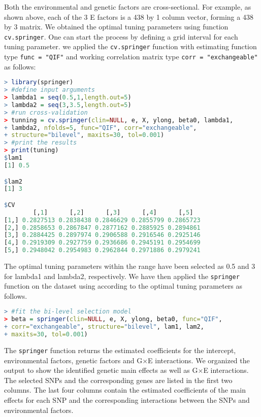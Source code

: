 \documentclass[12pt]{article}
\begin{document}
Both the environmental and genetic factors are cross-sectional. For example, as shown above, each of the 3 E factors is a 438 by 1 column vector, forming a 438 by 3 matrix. We obtained the optimal tuning parameters using function \texttt{cv.springer}. One can start the process by defining a grid interval for each tuning parameter. we applied the \texttt{cv.springer} function with estimating function type \texttt{func = "QIF"} and working correlation matrix type \texttt{corr = "exchangeable"} as follows:

\begin{lstlisting}[language=R]
> library(springer)
> #define input arguments
> lambda1 = seq(0.5,1,length.out=5)
> lambda2 = seq(3,3.5,length.out=5)
> #run cross-validation   
> tunning = cv.springer(clin=NULL, e, X, ylong, beta0, lambda1,
+ lambda2, nfolds=5, func="QIF", corr="exchangeable",
+ structure="bilevel", maxits=30, tol=0.001)
> #print the results
> print(tuning)
$lam1
[1] 0.5

$lam2
[1] 3

$CV
        [,1]      [,2]      [,3]      [,4]      [,5]
[1,] 0.2827513 0.2838438 0.2846629 0.2855799 0.2865723
[2,] 0.2858653 0.2867847 0.2877162 0.2885925 0.2894861
[3,] 0.2884425 0.2897974 0.2906588 0.2916546 0.2925146
[4,] 0.2919309 0.2927759 0.2936686 0.2945191 0.2954699
[5,] 0.2948042 0.2954983 0.2962844 0.2971886 0.2979241
\end{lstlisting}  

The optimal tuning parameters within the range have been selected as 0.5 and 3 for lambda1 and lambda2, respectively. We have then applied the \texttt{springer} function on the dataset using according to the optimal tuning parameters as follows.
 
\begin{lstlisting}[language=R]
> #fit the bi-level selection model
> beta = springer(clin=NULL, e, X, ylong, beta0, func="QIF",
+ corr="exchangeable", structure="bilevel", lam1, lam2,
+ maxits=30, tol=0.001)
\end{lstlisting}  

The \texttt{springer} function returns the estimated coefficients for the intercept, environmental factors, genetic factors and G$\times$E interactions. We organized the output to show the identified genetic main effects as well as G$\times$E interactions. The selected SNPs and the corresponding genes are listed in the first two columns. The last four columns contain the estimated coefficients of the main effects for each SNP and the corresponding interactions between the SNPs and environmental factors.
\end{document}

